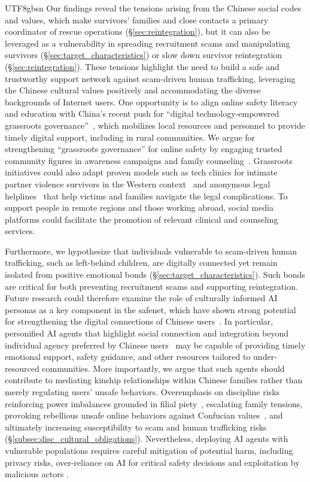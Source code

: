 \documentclass[sigconf,nonacm]{acmart}
\newcommand{\rev}[1]{#1}
\begin{document}
\begin{CJK}{UTF8}{gbsn}
Our findings reveal the tensions arising from the Chinese social codes and values, which make survivors' families and close contacts a primary coordinator of rescue operations (\S\ref{sec:reintegration}), but it can also be leveraged as a vulnerability in spreading recruitment scams and manipulating survivors (\S\ref{sec:target_characteristics}) or slow down survivor reintegration (\S\ref{sec:reintegration}). These tensions highlight the need to build a safe and trustworthy support network against scam-driven human trafficking, leveraging the Chinese cultural values positively and accommodating the diverse backgrounds of Internet users. One opportunity is to align online safety literacy and education with China's recent push for ``digital technology-empowered grassroots governance''~\cite{liang2022digital_governance}, which mobilizes local resources and personnel to provide timely digital support, including in rural communities. We argue for strengthening ``grassroots governance'' for online safety by engaging trusted community figures in awareness campaigns and family counseling~\cite{wang2007grassroots}. Grassroots initiatives could also adapt proven models such as tech clinics for intimate partner violence survivors in the Western context~\cite{havron-sec19, gupta-sec24} and anonymous legal helplines~\cite{horn2015stop} that help victims and families navigate the legal complications. To support people in remote regions and those working abroad, social media platforms could facilitate the promotion of relevant clinical and counseling services.

    \rev{Furthermore, we hypothesize that individuals vulnerable to scam-driven human trafficking, such as left-behind children, are digitally connected yet remain isolated from positive emotional bonds (\S\ref{sec:target_characteristics}). Such bonds are critical for both preventing recruitment scams and supporting reintegration. Future research could therefore examine the role of culturally informed AI personas as a key component in the safenet, which have shown strong potential for strengthening the digital connections of Chinese users~\cite{lei2025ai, wan-cscw24}. In particular, personified AI agents that highlight social connection and integration beyond individual agency preferred by Chinese users~\cite{sun2025rethinking, ge-chi24} may be capable of providing timely emotional support, safety guidance, and other resources tailored to under-resourced communities. More importantly, we argue that such agents should contribute to mediating kinship relationships within Chinese families rather than merely regulating users' unsafe behaviors. Overemphasis on discipline risks reinforcing power imbalances grounded in filial piety~\cite{deng-deng25}, escalating family tensions, provoking rebellious unsafe online behaviors against Confucian values~\cite{rao2019confucianism}, and ultimately increasing susceptibility to scam and human trafficking risks (\S\ref{subsec:disc_cultural_obligations}).} Nevertheless, deploying AI agents with vulnerable populations requires careful mitigation of potential harm, including privacy risks, over-reliance on AI for critical safety decisions and exploitation by malicious actors \cite{weidinger2022taxonomy}.


\end{CJK}
\end{document}
